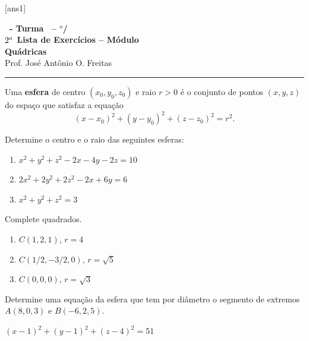 \documentclass[12pt]{exam}
\begin{document}
    [ans1]

    \begin{center}
        {\Large\bf \disciplina\ - Turma \turma\ -- \semestre$^{o}$/\ano} \\ \vspace{9pt} {\large\bf
            $2^a$ Lista de Exercícios -- Módulo \numeromodulo\\ Quádricas}\\ \vspace{9pt} Prof. José Antônio O. Freitas
    \end{center}

    \hrule

    \vspace{.6cm}

    Uma \textbf{esfera} de centro $(x_0,y_0,z_0)$ e raio $r > 0$ é o conjunto de pontos $(x,y,z)$ do espaço que satisfaz a equação
    \[
    (x - x_0)^2 + (y - y_0)^2 + (z - z_0)^2 = r^2.
    \]

    \begin{exercicio}
        Determine o centro e o raio das seguintes esferas:
        \begin{enumerate}[label=({\alph*})]
            \item $x^2 + y^2 + z^2 - 2x - 4y - 2z = 10$
            \item $2x^2 + 2y^2 + 2z^2 - 2x + 6y = 6$
            \item $x^2 + y^2 + z^2 = 3$
        \end{enumerate}
        \begin{solucao}
            Complete quadrados.
            \begin{enumerate}[label=({\alph*})]
                \item $C(1,2,1)$, $r = 4$
                \item $C(1/2,-3/2,0)$, $r = \sqrt{5}$
                \item $C(0,0,0)$, $r = \sqrt{3}$
            \end{enumerate}
        \end{solucao}
    \end{exercicio}

    \begin{exercicio}
        Determine uma equação da esfera que tem por diâmetro o segmento de extremos $A(8,0,3)$ e $B(-6,2,5)$.
        \begin{solucao}
            $(x - 1)^2 + (y - 1)^2 + (z - 4)^2 = 51$
        \end{solucao}
    \end{exercicio}
\end{document}

